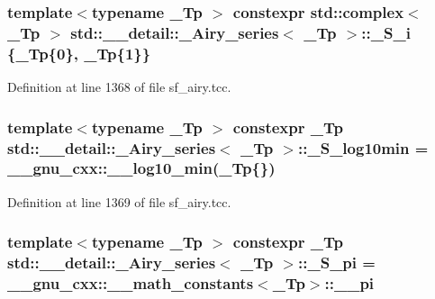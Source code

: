 \subsubsection[{\texorpdfstring{\+\_\+\+S\+\_\+i}{_S_i}}]{\setlength{\rightskip}{0pt plus 5cm}template$<$typename \+\_\+\+Tp $>$ constexpr std\+::complex$<$ \+\_\+\+Tp $>$ {\bf std\+::\+\_\+\+\_\+detail\+::\+\_\+\+Airy\+\_\+series}$<$ \+\_\+\+Tp $>$\+::\+\_\+\+S\+\_\+i \{\+\_\+\+Tp\{0\}, \+\_\+\+Tp\{1\}\}\hspace{0.3cm}{\ttfamily [static]}}\hypertarget{classstd_1_1____detail_1_1__Airy__series_a4133b308af0c967a73c918af22c93b09}{}\label{classstd_1_1____detail_1_1__Airy__series_a4133b308af0c967a73c918af22c93b09}


Definition at line 1368 of file sf\+\_\+airy.\+tcc.

\subsubsection[{\texorpdfstring{\+\_\+\+S\+\_\+log10min}{_S_log10min}}]{\setlength{\rightskip}{0pt plus 5cm}template$<$typename \+\_\+\+Tp $>$ constexpr \+\_\+\+Tp {\bf std\+::\+\_\+\+\_\+detail\+::\+\_\+\+Airy\+\_\+series}$<$ \+\_\+\+Tp $>$\+::\+\_\+\+S\+\_\+log10min = \+\_\+\+\_\+gnu\+\_\+cxx\+::\+\_\+\+\_\+log10\+\_\+min(\+\_\+\+Tp\{\})\hspace{0.3cm}{\ttfamily [static]}}\hypertarget{classstd_1_1____detail_1_1__Airy__series_a57bb7eedba6245beb6be7e84b82d405c}{}\label{classstd_1_1____detail_1_1__Airy__series_a57bb7eedba6245beb6be7e84b82d405c}


Definition at line 1369 of file sf\+\_\+airy.\+tcc.

\subsubsection[{\texorpdfstring{\+\_\+\+S\+\_\+pi}{_S_pi}}]{\setlength{\rightskip}{0pt plus 5cm}template$<$typename \+\_\+\+Tp $>$ constexpr \+\_\+\+Tp {\bf std\+::\+\_\+\+\_\+detail\+::\+\_\+\+Airy\+\_\+series}$<$ \+\_\+\+Tp $>$\+::\+\_\+\+S\+\_\+pi = \+\_\+\+\_\+gnu\+\_\+cxx\+::\+\_\+\+\_\+math\+\_\+constants$<$\+\_\+\+Tp$>$\+::\+\_\+\+\_\+pi\hspace{0.3cm}{\ttfamily [static]}}\hypertarget{classstd_1_1____detail_1_1__Airy__series_a9de354dae47d41acc60824681d864184}{}\label{classstd_1_1____detail_1_1__Airy__series_a9de354dae47d41acc60824681d864184}


